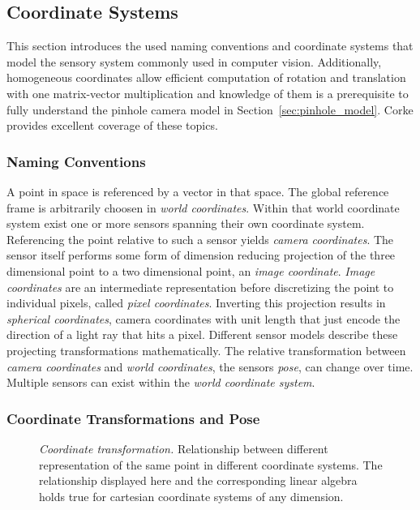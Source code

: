 \subsection{Coordinate Systems}

This section introduces the used naming conventions and coordinate systems that model the sensory system commonly used in computer vision.
Additionally, homogeneous coordinates allow efficient computation of rotation and translation with one matrix-vector multiplication and knowledge of them is a prerequisite to fully understand the pinhole camera model in Section~\ref{sec:pinhole_model}.
Corke\cite[p. 15-39,533]{corke_2011} provides excellent coverage of these topics.

\subsubsection*{Naming Conventions}

A point in space is referenced by a vector in that space.
The global reference frame is arbitrarily choosen in \emph{world coordinates}.
Within that world coordinate system exist one or more sensors spanning their own coordinate system.
Referencing the point relative to such a sensor yields \emph{camera coordinates}.
The sensor itself performs some form of dimension reducing projection of the three dimensional point to a two dimensional point, an \emph{image coordinate}\cite[p. 251-261]{corke_2011}.
\emph{Image coordinates} are an intermediate representation before discretizing the point to individual pixels, called \emph{pixel coordinates}.
Inverting this projection results in \emph{spherical coordinates}, camera coordinates with unit length that just encode the direction of a light ray that hits a pixel.
Different sensor models describe these projecting transformations mathematically.
The relative transformation between \emph{camera coordinates} and \emph{world coordinates}, the sensors \emph{pose}, can change over time.
Multiple sensors can exist within the \emph{world coordinate system}.

\subsubsection*{Coordinate Transformations and Pose}

\begin{figure}[H]
    \scalebox{0.7}{%
    
    }
    \caption[Coordinate transformation]{\emph{Coordinate transformation.} Relationship between different representation of the same point in different coordinate systems. The relationship displayed here and the corresponding linear algebra holds true for cartesian coordinate systems of any dimension.}\label{fig:coordinate_transformation}
\end{figure}

